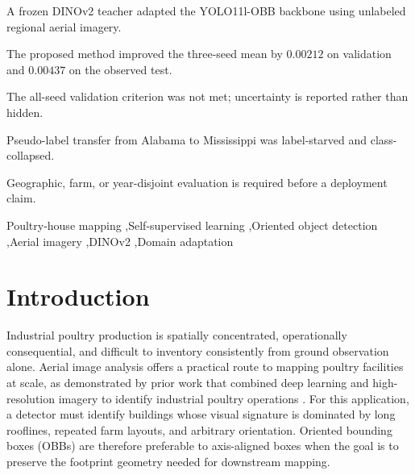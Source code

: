 \documentclass[preprint,12pt,authoryear]{elsarticle}
\begin{document}
\begin{frontmatter}
\begin{abstract}
\textbf{Conclusions:} Domain-anchored DINOv2 adaptation is a technically coherent and promising route for poultry-house OBB detection, but the present evidence does not establish a robust superiority claim. The current test files are byte-disjoint, yet every test source group recurs in development and near-duplicate structure is present. A geographic, farm, or year-disjoint test is therefore required before claiming generalization or deployment readiness.
\end{abstract}

\begin{highlights}
\item A frozen DINOv2 teacher adapted the YOLO11l-OBB backbone using unlabeled regional aerial imagery.
\item The proposed method improved the three-seed mean by $0.00212$ on validation and $0.00437$ on the observed test.
\item The all-seed validation criterion was not met; uncertainty is reported rather than hidden.
\item Pseudo-label transfer from Alabama to Mississippi was label-starved and class-collapsed.
\item Geographic, farm, or year-disjoint evaluation is required before a deployment claim.
\end{highlights}

\begin{keyword}
Poultry-house mapping \sep Self-supervised learning \sep Oriented object detection \sep Aerial imagery \sep DINOv2 \sep Domain adaptation
\end{keyword}

\end{frontmatter}

\section{Introduction}
\label{sec:introduction}

Industrial poultry production is spatially concentrated, operationally consequential, and difficult to inventory consistently from ground observation alone. Aerial image analysis offers a practical route to mapping poultry facilities at scale, as demonstrated by prior work that combined deep learning and high-resolution imagery to identify industrial poultry operations \citep{robinson2021poultry}. For this application, a detector must identify buildings whose visual signature is dominated by long rooflines, repeated farm layouts, and arbitrary orientation. Oriented bounding boxes (OBBs) are therefore preferable to axis-aligned boxes when the goal is to preserve the footprint geometry needed for downstream mapping.
\end{document}
